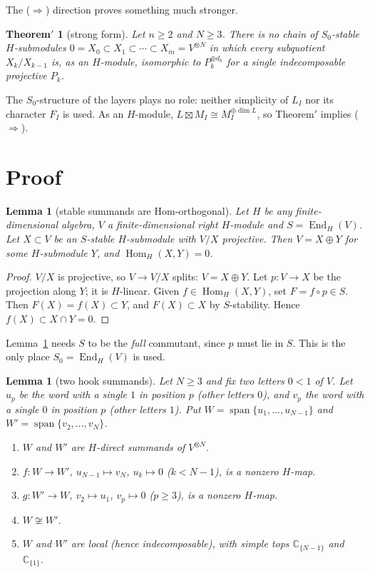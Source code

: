 \documentclass[11pt]{amsart}
\newcommand{\Hom}{\operatorname{Hom}}
\newcommand{\End}{\operatorname{End}}
\newcommand{\C}{\mathbb{C}}
\theoremstyle{plain}
\newtheorem*{theoremprime}{Theorem$'$}
\newtheorem{lemma}[theorem]{Lemma}
\theoremstyle{definition}
\begin{document}
The ($\Rightarrow$) direction proves something much stronger.

\begin{theoremprime}[strong form]
Let $n\ge2$ and $N\ge3$. There is no chain of $S_0$-stable $H$-submodules $0=X_0\subset X_1\subset\cdots\subset X_m=V^{\otimes N}$ in which every subquotient $X_k/X_{k-1}$ is, as an $H$-module, isomorphic to $P_k^{\oplus d_k}$ for a single indecomposable projective $P_k$.
\end{theoremprime}

The $S_0$-structure of the layers plays no role: neither simplicity of $L_I$ nor its character $F_I$ is used. As an $H$-module, $L\boxtimes M_I\cong M_I^{\oplus\dim L}$, so Theorem$'$ implies ($\Rightarrow$).

\section{Proof}

\begin{lemma}[stable summands are Hom-orthogonal]\label{lem:1}
Let $H$ be any finite-dimensional algebra, $V$ a finite-dimensional right $H$-module and $S=\End_H(V)$. Let $X\subset V$ be an $S$-stable $H$-submodule with $V/X$ projective. Then $V=X\oplus Y$ for some $H$-submodule $Y$, and $\Hom_H(X,Y)=0$.
\end{lemma}

\begin{proof}
$V/X$ is projective, so $V\to V/X$ splits: $V=X\oplus Y$. Let $p:V\to X$ be the projection along $Y$; it is $H$-linear. Given $f\in\Hom_H(X,Y)$, set $F=f\circ p\in S$. Then $F(X)=f(X)\subset Y$, and $F(X)\subset X$ by $S$-stability. Hence $f(X)\subset X\cap Y=0$.
\end{proof}

Lemma~\ref{lem:1} needs $S$ to be the \emph{full} commutant, since $p$ must lie in $S$. This is the only place $S_0=\End_H(V)$ is used.

\begin{lemma}[two hook summands]\label{lem:2}
Let $N\ge3$ and fix two letters $0<1$ of $V$. Let $u_p$ be the word with a single $1$ in position $p$ (other letters $0$), and $v_p$ the word with a single $0$ in position $p$ (other letters $1$). Put $W=\operatorname{span}\{u_1,\dots,u_{N-1}\}$ and $W'=\operatorname{span}\{v_2,\dots,v_N\}$.
\begin{enumerate}[label=(\alph*),itemsep=1pt]
\item $W$ and $W'$ are $H$-direct summands of $V^{\otimes N}$.
\item $f:W\to W'$, $u_{N-1}\mapsto v_N$, $u_k\mapsto0$ ($k<N-1$), is a nonzero $H$-map.
\item $g:W'\to W$, $v_2\mapsto u_1$, $v_p\mapsto0$ ($p\ge3$), is a nonzero $H$-map.
\item $W\not\cong W'$.
\item $W$ and $W'$ are local (hence indecomposable), with simple tops $\C_{\{N-1\}}$ and $\C_{\{1\}}$.
\end{enumerate}
\end{lemma}
\end{document}
